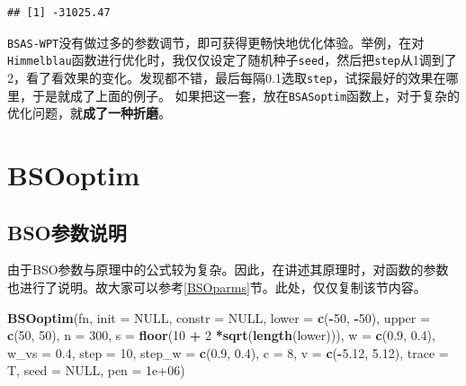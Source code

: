 \documentclass[]{ctexbook}
\newenvironment{Shaded}{\begin{snugshade}}{\end{snugshade}}
\newcommand{\KeywordTok}[1]{\textcolor[rgb]{0.13,0.29,0.53}{\textbf{#1}}}
\newcommand{\DataTypeTok}[1]{\textcolor[rgb]{0.13,0.29,0.53}{#1}}
\newcommand{\DecValTok}[1]{\textcolor[rgb]{0.00,0.00,0.81}{#1}}
\newcommand{\FloatTok}[1]{\textcolor[rgb]{0.00,0.00,0.81}{#1}}
\newcommand{\StringTok}[1]{\textcolor[rgb]{0.31,0.60,0.02}{#1}}
\newcommand{\OtherTok}[1]{\textcolor[rgb]{0.56,0.35,0.01}{#1}}
\newcommand{\OperatorTok}[1]{\textcolor[rgb]{0.81,0.36,0.00}{\textbf{#1}}}
\newcommand{\NormalTok}[1]{#1}
\theoremstyle{definition}
\theoremstyle{definition}
\theoremstyle{definition}
\theoremstyle{remark}
\begin{document}
\begin{verbatim}
## [1] -31025.47
\end{verbatim}

\texttt{BSAS-WPT}没有做过多的参数调节，即可获得更畅快地优化体验。举例，在对\texttt{Himmelblau}函数进行优化时，我仅仅设定了随机种子\texttt{seed}，然后把\texttt{step}从1调到了2，看了看效果的变化。发现都不错，最后每隔0.1选取\texttt{step}，试探最好的效果在哪里，于是就成了上面的例子。
如果把这一套，放在\texttt{BSASoptim}函数上，对于复杂的优化问题，就\textbf{成了一种折磨}。

\section{BSOoptim}\label{bsooptim}

\subsection{BSO参数说明}\label{BSOfuncparms}

由于BSO参数与原理中的公式较为复杂。因此，在讲述其原理时，对函数的参数也进行了说明。故大家可以参考\ref{BSOparms}节。此处，仅仅复制该节内容。

\begin{Shaded}
\begin{Highlighting}[]
\KeywordTok{BSOoptim}\NormalTok{(fn, }\DataTypeTok{init =} \OtherTok{NULL}\NormalTok{, }\DataTypeTok{constr =} \OtherTok{NULL}\NormalTok{, }
         \DataTypeTok{lower =} \KeywordTok{c}\NormalTok{(}\OperatorTok{-}\DecValTok{50}\NormalTok{, }\OperatorTok{-}\DecValTok{50}\NormalTok{), }\DataTypeTok{upper =} \KeywordTok{c}\NormalTok{(}\DecValTok{50}\NormalTok{, }\DecValTok{50}\NormalTok{), }\DataTypeTok{n =} \DecValTok{300}\NormalTok{, }
         \DataTypeTok{s =} \KeywordTok{floor}\NormalTok{(}\DecValTok{10} \OperatorTok{+}\StringTok{ }\DecValTok{2} \OperatorTok{*}\KeywordTok{sqrt}\NormalTok{(}\KeywordTok{length}\NormalTok{(lower))), }
         \DataTypeTok{w =} \KeywordTok{c}\NormalTok{(}\FloatTok{0.9}\NormalTok{, }\FloatTok{0.4}\NormalTok{), }
         \DataTypeTok{w_vs =} \FloatTok{0.4}\NormalTok{, }
         \DataTypeTok{step =} \DecValTok{10}\NormalTok{,}
         \DataTypeTok{step_w =} \KeywordTok{c}\NormalTok{(}\FloatTok{0.9}\NormalTok{, }\FloatTok{0.4}\NormalTok{), }
         \DataTypeTok{c =} \DecValTok{8}\NormalTok{, }
         \DataTypeTok{v =} \KeywordTok{c}\NormalTok{(}\OperatorTok{-}\FloatTok{5.12}\NormalTok{, }\FloatTok{5.12}\NormalTok{), }
         \DataTypeTok{trace =}\NormalTok{ T,}
         \DataTypeTok{seed =} \OtherTok{NULL}\NormalTok{, }
         \DataTypeTok{pen =} \FloatTok{1e+06}\NormalTok{)}
\end{Highlighting}
\end{Shaded}
\end{document}
